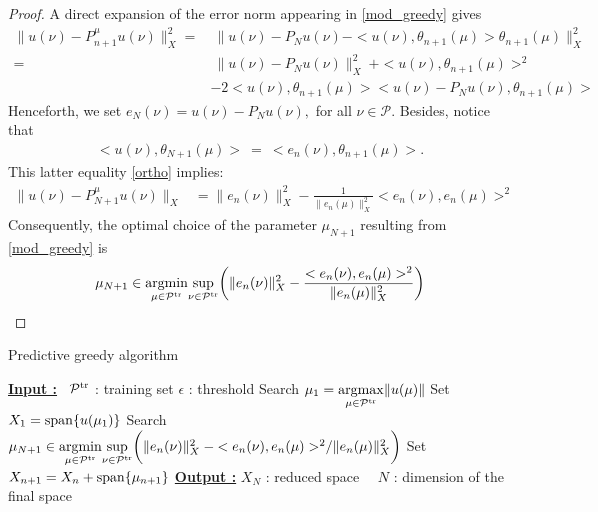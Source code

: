 \documentclass[12pt,a4paper]{article}
\newcommand{\Ptr}{\mathcal P^{\rm tr}}
\newcommand{\tr}{{\rm tr}}
\newcommand{\calP}{\mathcal P}
\begin{document}
\begin{proof}
A direct expansion of the error norm appearing in \eqref{mod_greedy} gives
\begin{align*}
\|u(\nu)- P^\mu_{n+1} u(\nu)\|^2_X  =& \ \|u(\nu)-P_N u(\nu)-<u(\nu),\theta_{n+1}(\mu)>\theta_{n+1}(\mu)\|^2_X \\
=&\ \|u(\nu)-P_N u(\nu)\|_X^2 \ + <u(\nu),\theta_{n+1}(\mu)>^2  \\
&- 2 <u(\nu),\theta_{n+1}(\mu)><u(\nu)-P_N u(\nu),\theta_{n+1}(\mu) > 
\end{align*}
Henceforth, we set $e_N(\nu) = u(\nu)-P_N u(\nu),$ for all $\nu \in \mathcal P$. Besides, notice that
\begin{align}\label{ortho}
<u(\nu),\theta_{N+1}(\mu)>\ =\ <e_n(\nu),\theta_{n+1}(\mu)>.
\end{align}
This latter equality \eqref{ortho} implies:
\begin{align}\label{err_est}
\|u(\nu)- P^\mu_{N+1} u(\nu)\|_X   &= \|e_n(\nu)\|_X^2 -\frac{1}{\|e_n(\mu)\|_X^2} <e_n(\nu), e_n(\mu)>^2 
\end{align}
Consequently, the optimal choice of the parameter $\mu_{N+1}$ resulting from \eqref{mod_greedy} is 
\begin{equation*}
\mu_{N+1} \in \underset{\mu \in \calP^\tr}{\mathrm{argmin}}
\underset{\nu \in \calP^\tr} {\mathrm{\ sup\ }}
\bigg( \|e_n(\nu)\|_X^2 -\frac{<e_n(\nu), e_n(\mu)>^2}{\|e_n(\mu)\|_X^2} \bigg)
\end{equation*}
\end{proof}

\begin{algorithm}[H]
\caption{Predictive greedy algorithm}\label{alg:predictive}
\begin{algorithmic}[1]
\Statex \textbf{\underline{Input :}}
\ $\Ptr$ : training set
\Statex\qquad\qquad $\epsilon$ : threshold
\State Search $\mu_1 = \underset{\mu\in\Ptr}{\rm argmax}\|u(\mu)\|$
\State Set $X_1 = {\rm span}\{u(\mu_1)\}$
\While{ $>\epsilon$}
\State Search $ \mu_{N+1} \in \underset{\mu \in \calP^\tr}{\mathrm{argmin}}
\underset{\nu \in \calP^\tr} {\mathrm{\ sup\ }}
\bigg( \|e_n(\nu)\|_X^2 -{<e_n(\nu), e_n(\mu)>^2}/{\|e_n(\mu)\|_X^2} \bigg)$
\State Set $X_{n+1} = X_n + {\rm span}\{\mu_{n+1}\}$
\EndWhile
\Statex \textbf{\underline {Output :}}
$X_N$ : reduced space
\Statex \qquad\qquad\ \ ${N}$ : dimension of the final space
\vspace{0.2cm}
\end{algorithmic}
\end{algorithm}
\end{document}
